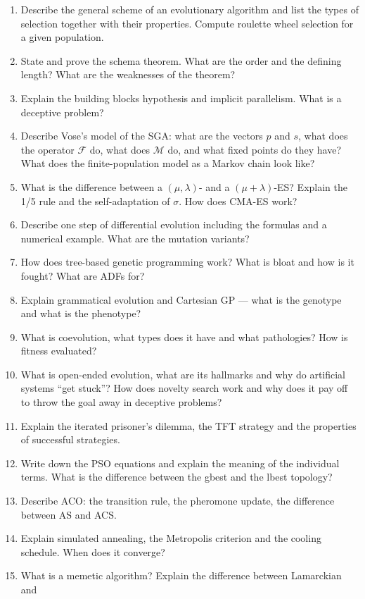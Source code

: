 \documentclass[11pt,a4paper]{article}
\theoremstyle{definition}
\providecommand{\uv}[1]{``#1''}
\begin{document}
\begin{enumerate}
\item Describe the general scheme of an evolutionary algorithm and list the
  types of selection together with their properties. Compute roulette wheel
  selection for a given population.
\item State and prove the schema theorem. What are the order and the defining
  length? What are the weaknesses of the theorem?
\item Explain the building blocks hypothesis and implicit parallelism.
  What is a deceptive problem?
\item Describe Vose's model of the SGA: what are the vectors $p$ and $s$, what
  does the operator $\mathcal{F}$ do, what does $\mathcal{M}$ do, and what fixed
  points do they have? What does the finite-population model as a Markov chain
  look like?
\item What is the difference between a $(\mu,\lambda)$- and a
  $(\mu+\lambda)$-ES? Explain the 1/5 rule and the self-adaptation of $\sigma$.
  How does CMA-ES work?
\item Describe one step of differential evolution including the formulas and a
  numerical example. What are the mutation variants?
\item How does tree-based genetic programming work? What is bloat and how is it
  fought? What are ADFs for?
\item Explain grammatical evolution and Cartesian GP --- what is the genotype
  and what is the phenotype?
\item What is coevolution, what types does it have and what pathologies? How is
  fitness evaluated?
\item What is open-ended evolution, what are its hallmarks and why do artificial
  systems \uv{get stuck}? How does novelty search work and why does it pay off
  to throw the goal away in deceptive problems?
\item Explain the iterated prisoner's dilemma, the TFT strategy and the
  properties of successful strategies.
\item Write down the PSO equations and explain the meaning of the individual
  terms. What is the difference between the gbest and the lbest topology?
\item Describe ACO: the transition rule, the pheromone update, the difference
  between AS and ACS.
\item Explain simulated annealing, the Metropolis criterion and the cooling
  schedule. When does it converge?
\item What is a memetic algorithm? Explain the difference between Lamarckian and

\end{enumerate}
\end{document}
